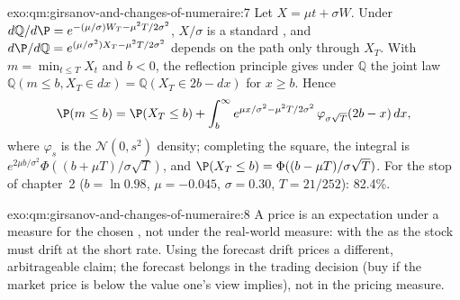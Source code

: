 \begin{solution}{exo:qm:girsanov-and-changes-of-numeraire:7}
Let $X = \mu t + \sigma W$. Under $d\mathbb Q/d\P = e^{-(\mu/\sigma)W_T - \mu^2T/2\sigma^2}$, $X/\sigma$ is a standard , and $d\P/d\mathbb Q = e^{(\mu/\sigma^2)X_T - \mu^2T/2\sigma^2}$ depends on the path only through $X_T$. With $m =
\min_{t\le T}X_t$ and $b < 0$, the reflection principle gives under $\mathbb Q$ the joint law $\mathbb Q(m \le b, X_T \in dx)
= \mathbb Q(X_T \in 2b - dx)$ for $x \ge b$. Hence
\[
\P(m \le b) = \P(X_T \le b) + \int_b^\infty e^{\mu x/\sigma^2 - \mu^2T/2\sigma^2}\,\varphi_{\sigma\sqrt T}(2b - x)\,dx,
\]
where $\varphi_s$ is the $\mathcal N(0, s^2)$ density; completing the square, the integral is $e^{2\mu b/\sigma^2}\Phi((b +
\mu T)/\sigma\sqrt T)$, and $\P(X_T \le b) = \Phi((b - \mu T)/\sigma\sqrt T)$. For the stop of chapter~2 ($b = \ln
0.98$, $\mu = -0.045$, $\sigma = 0.30$, $T = 21/252$): 82.4\%.
\end{solution}

\begin{solution}{exo:qm:girsanov-and-changes-of-numeraire:8}
A price is an expectation under a  measure for the chosen , not under the
real-world measure: with the  as  the stock must drift at the short
rate. Using the forecast drift prices a different, arbitrageable claim; the forecast belongs in the
trading decision (buy if the market price is below the value one's view implies), not in the
pricing measure.
\end{solution}

